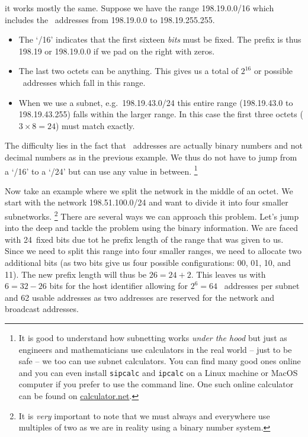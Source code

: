  it works mostly the same.
Suppose we have the range 198.19.0.0/16 which includes the  \IP\ addresses from 198.19.0.0 to 198.19.255.255.
\begin{itemize}
\item
   The `/16' indicates that the first sixteen \emph{bits} must be fixed.
   The prefix is thus 198.19 or 198.19.0.0 if we pad on the right with zeros.
\item
   The last two octets can be anything.
   This gives us a total of $2^{16}$ or  possible \IP\ addresses which fall in this range.
\item
   When we use a subnet, e.g.~198.19.43.0/24 this entire range (198.19.43.0 to 198.19.43.255) falls within the larger range.
   In this case the first three octets ($3\times8=24$) must match exactly.
\end{itemize}
The difficulty lies in the fact that \IP\ addresses are actually binary numbers and not decimal numbers as in the previous example.
We thus do not have to jump from a `/16' to a `/24' but can use any value in between.%
   \footnote{%
      It is good to understand how subnetting works \emph{under the hood} but just as engineers and mathematicians use calculators in the real world -- just to be safe -- we too can use subnet calculators.
      You can find many good ones online and you can even install \texttt{sipcalc} and \texttt{ipcalc} on a Linux machine or MacOS computer if you prefer to use the command line.
      One such online calculator can be found on \href{https://www.calculator.net/ip-subnet-calculator.html}{calculator.net}.
   }

Now take an example where we split the network in the middle of an octet.
We start with the network 198.51.100.0/24 and want to divide it into four smaller subnetworks.%
   \footnote{%
      It is \emph{very} important to note that we must always and everywhere use multiples of two as we are in reality using a binary number system.
   }
There are several ways we can approach this problem.
Let's jump into the deep and tackle the problem using the binary information.
We are faced with 24~fixed bits due tot he prefix length of the range that was given to us.
Since we need to split this range into four smaller ranges, we need to allocate two additional bits (as two bits give us four possible configurations: 00, 01, 10, and 11).
The new prefix length will thus be $26=24+2$.
This leaves us with $6=32-26$ bits for the host identifier allowing for $2^6=64$ \IP\ addresses per subnet and 62 usable addresses as two addresses are reserved for the network and broadcast addresses.

